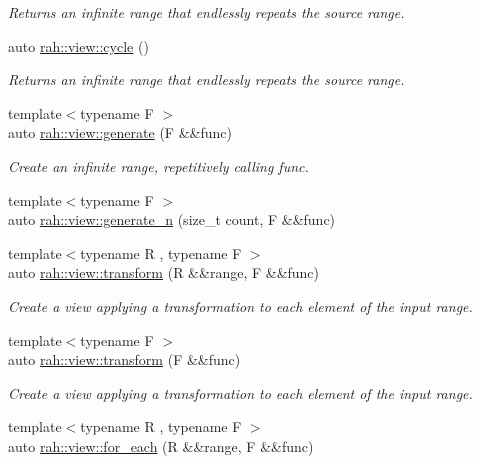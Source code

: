 \begin{DoxyCompactItemize}
\begin{DoxyCompactList}\small\item\em Returns an infinite range that endlessly repeats the source range. \end{DoxyCompactList}\item 
auto \mbox{\hyperlink{namespacerah_1_1view_a6d591740e70c1b826cabbec89e0df2be}{rah\+::view\+::cycle}} ()
\begin{DoxyCompactList}\small\item\em Returns an infinite range that endlessly repeats the source range. \end{DoxyCompactList}\item 
{\footnotesize template$<$typename F $>$ }\\auto \mbox{\hyperlink{namespacerah_1_1view_a9851b1ee90ae15252fb248417e084f69}{rah\+::view\+::generate}} (F \&\&func)
\begin{DoxyCompactList}\small\item\em Create an infinite range, repetitively calling func. \end{DoxyCompactList}\item 
{\footnotesize template$<$typename F $>$ }\\auto \mbox{\hyperlink{namespacerah_1_1view_ad1a52ac589db4f20ad204ce1df0d6835}{rah\+::view\+::generate\+\_\+n}} (size\+\_\+t count, F \&\&func)
\item 
{\footnotesize template$<$typename R , typename F $>$ }\\auto \mbox{\hyperlink{namespacerah_1_1view_ad8750f5c95edcf4f26b0a1c1eec3d676}{rah\+::view\+::transform}} (R \&\&range, F \&\&func)
\begin{DoxyCompactList}\small\item\em Create a view applying a transformation to each element of the input range. \end{DoxyCompactList}\item 
{\footnotesize template$<$typename F $>$ }\\auto \mbox{\hyperlink{namespacerah_1_1view_a7c981c90e5ad03eca3ec738176feaf7d}{rah\+::view\+::transform}} (F \&\&func)
\begin{DoxyCompactList}\small\item\em Create a view applying a transformation to each element of the input range. \end{DoxyCompactList}\item 
{\footnotesize template$<$typename R , typename F $>$ }\\auto \mbox{\hyperlink{namespacerah_1_1view_aeecb42c8a3ea83ad0c50ca3b74a8d62c}{rah\+::view\+::for\+\_\+each}} (R \&\&range, F \&\&func)

\end{DoxyCompactItemize}
